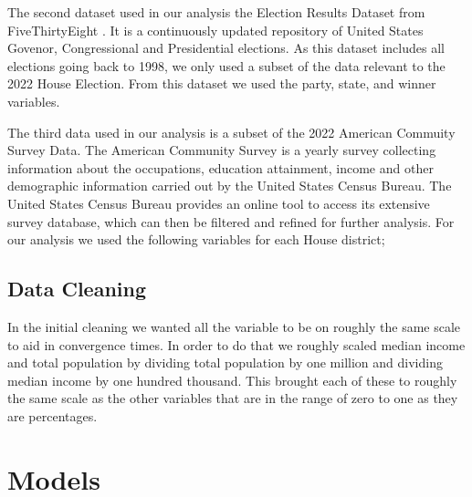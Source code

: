 \documentclass[12pt]{article}
\begin{document}
The second dataset used in our analysis the Election Results Dataset from FiveThirtyEight \cite{electionresultsdataset}. It is a continuously updated repository of United States Govenor, Congressional and Presidential elections. As this dataset includes all elections going back to 1998, we only used a subset of the data relevant to the 2022 House Election. From this dataset we used the party, state, and winner variables. 

The third data used in our analysis is a subset of the 2022 American Commuity Survey Data. The American Community Survey is a yearly survey collecting information about the occupations, education attainment, income and other demographic information carried out by the United States Census Bureau. The United States Census Bureau provides an online tool to access its extensive survey database, which can then be filtered and refined for further analysis. For our analysis we used the following variables for each House district; 



\subsection{Data Cleaning}

In the initial cleaning we wanted all the variable to be on roughly the same scale to aid in convergence times. In order to do that we roughly scaled median income and total population by dividing total population by one million and dividing median income by one hundred thousand. This brought each of these to roughly the same scale as the other variables that are in the range of zero to one as they are percentages. 

\section{Models}
\end{document}
